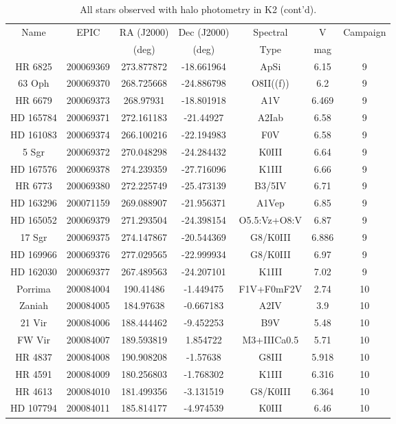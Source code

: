 \begin{table*}
\caption{All stars observed with halo photometry in K2 (cont'd).}
\begin{tabular}{ccccccc}
\hline \hline
Name & EPIC & RA (J2000) & Dec (J2000) & Spectral & V & Campaign \\
 &  & (deg) & (deg) & Type & mag &  \\
\hline
HR 6825 & 200069369 & 273.877872 & -18.661964 & ApSi & 6.15 & 9 \\
63 Oph & 200069370 & 268.725668 & -24.886798 & O8II((f)) & 6.2 & 9 \\
HR 6679 & 200069373 & 268.97931 & -18.801918 & A1V & 6.469 & 9 \\
HD 165784 & 200069371 & 272.161183 & -21.44927 & A2Iab & 6.58 & 9 \\
HD 161083 & 200069374 & 266.100216 & -22.194983 & F0V & 6.58 & 9 \\
5 Sgr & 200069372 & 270.048298 & -24.284432 & K0III & 6.64 & 9 \\
HD 167576 & 200069378 & 274.239359 & -27.716096 & K1III & 6.66 & 9 \\
HR 6773 & 200069380 & 272.225749 & -25.473139 & B3/5IV & 6.71 & 9 \\
HD 163296 & 200071159 & 269.088907 & -21.956371 & A1Vep & 6.85 & 9 \\
HD 165052 & 200069379 & 271.293504 & -24.398154 & O5.5:Vz+O8:V & 6.87 & 9 \\
17 Sgr & 200069375 & 274.147867 & -20.544369 & G8/K0III & 6.886 & 9 \\
HD 169966 & 200069376 & 277.029565 & -22.999934 & G8/K0III & 6.97 & 9 \\
HD 162030 & 200069377 & 267.489563 & -24.207101 & K1III & 7.02 & 9 \\
Porrima & 200084004 & 190.41486 & -1.449475 & F1V+F0mF2V & 2.74 & 10 \\
Zaniah & 200084005 & 184.97638 & -0.667183 & A2IV & 3.9 & 10 \\
21 Vir & 200084006 & 188.444462 & -9.452253 & B9V & 5.48 & 10 \\
FW Vir & 200084007 & 189.593819 & 1.854722 & M3+IIICa0.5 & 5.71 & 10 \\
HR 4837 & 200084008 & 190.908208 & -1.57638 & G8III & 5.918 & 10 \\
HR 4591 & 200084009 & 180.256803 & -1.768302 & K1III & 6.316 & 10 \\
HR 4613 & 200084010 & 181.499356 & -3.131519 & G8/K0III & 6.364 & 10 \\
HD 107794 & 200084011 & 185.814177 & -4.974539 & K0III & 6.46 & 10 \\

\end{tabular}
\end{table*}
